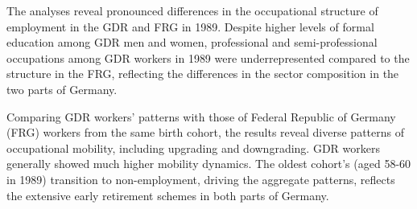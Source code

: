 \begin{Article}
\begin{refsection}[Spitz]
The analyses reveal pronounced differences in the occupational structure of employment in the GDR and FRG in 1989. Despite higher levels of formal education among GDR men and women, professional and semi-professional occupations among GDR workers in 1989 were underrepresented compared to the structure in the FRG, reflecting the differences in the sector composition in the two parts of Germany.

Comparing GDR workers' patterns with those of Federal Republic of Germany (FRG) workers from the same birth cohort, the results reveal diverse patterns of occupational mobility, including upgrading and downgrading. GDR workers generally showed much higher mobility dynamics. The oldest cohort's (aged 58-60 in 1989) transition to non-employment, driving the aggregate patterns, reflects the extensive early retirement schemes in both parts of Germany.

\begingroup
\setlength{\emergencystretch}{3em}
\printbibliography
\endgroup




\end{refsection}
\end{Article}
